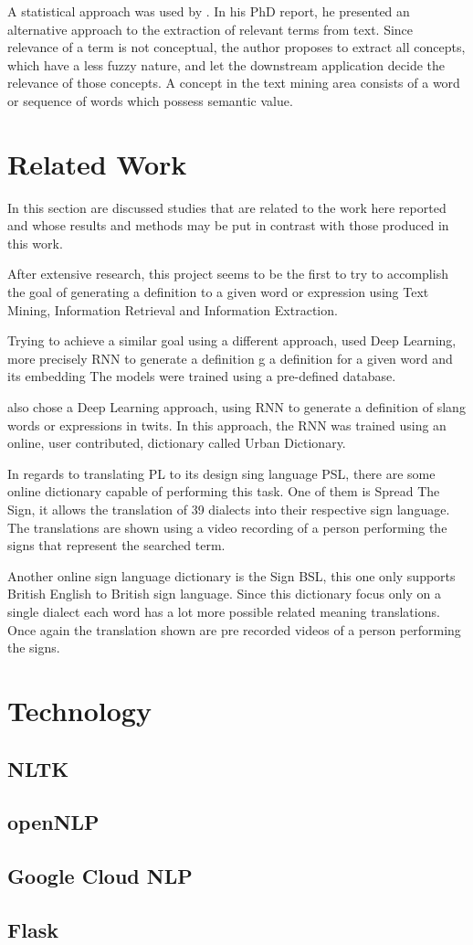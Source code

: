 A statistical approach was used by \textcite{ventura_2014}.
In his PhD report, he presented an alternative approach to the extraction of relevant terms from text.
Since relevance of a term is not conceptual, the author proposes to extract all concepts, which have a less fuzzy nature, and let the downstream application decide the relevance of those concepts.
A concept in the text mining area consists of a word or sequence of words which possess semantic value.

\section{Related Work}

In this section are discussed studies that are related to the work here reported and whose results and methods may be put in contrast with those produced in this work.

After extensive research, this project seems to be the first to try to accomplish the goal of generating a definition to a given word or expression using Text Mining, Information Retrieval and Information Extraction.

Trying to achieve a similar goal using a different approach, \textcite{noraset_2016} used Deep Learning, more precisely \gls{RNN} to generate a definition g a definition for a given word and its embedding
The models were trained using a pre-defined database.

\textcite{ni_2017} also chose a Deep Learning approach, using \gls{RNN} to generate a definition of slang words or expressions in twits.
In this approach, the \gls{RNN} was trained using an online, user contributed, dictionary called Urban Dictionary.

In regards to translating PL to its design sing language PSL, there are some online dictionary capable of performing this task.
One of them is Spread The Sign, it allows the translation of 39 dialects into their respective sign language.
The translations are shown using a video recording of a person performing the signs that represent the searched term.

Another online sign language dictionary is the Sign BSL, this one only supports British English to British sign language.
Since this dictionary focus only on a single dialect each word has a lot more possible related meaning translations.
Once again the translation shown are pre recorded videos of a person performing the signs.

\section{Technology}

\subsection{NLTK}

\subsection{openNLP}

\subsection{Google Cloud NLP}

\subsection{Flask}
